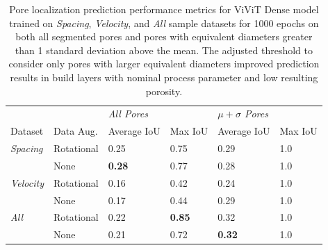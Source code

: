 \begin{table}
  \begin{tabular}{ll|ll|ll}
    \hline
    \rowcolor{gray!30}
                        &                   & \multicolumn{2}{|l|}{\textit{All Pores}}  & \multicolumn{2}{l}{\textit{$\mu + \sigma$ Pores}} \\
    \rowcolor{gray!30}
    Dataset             & Data Aug. & Average IoU    & Max IoU                  & Average IoU    & Max IoU                          \\
    \hline                                 
    \textit{Spacing}    &  Rotational       & 0.25           & 0.75                     & 0.29           & 1.0                     \\
                        &  None             & \textbf{0.28}  & 0.77                     & 0.28           & 1.0                              \\
    \rowcolor{gray!10}                     
    \textit{Velocity}   &  Rotational       & 0.16           & 0.42                     & 0.24           & 1.0                              \\
    \rowcolor{gray!10}                     
                        &  None             & 0.17           & 0.44                     & 0.29           & 1.0                              \\
    \textit{All}        &  Rotational       & 0.22           & \textbf{0.85}            & 0.32           & 1.0                              \\
                        &  None             & 0.21           & 0.72                     & \textbf{0.32}  & 1.0                     \\
    \hline
  \end{tabular}
  \caption{
    Pore localization prediction performance metrics for ViViT Dense model
    trained on \textit{Spacing}, \textit{Velocity}, and \textit{All} sample
    datasets for 1000 epochs on both all segmented pores and pores with
    equivalent diameters greater than 1 standard deviation above the mean. The
    adjusted threshold to consider only pores with larger equivalent diameters
    improved prediction results in build layers with nominal process parameter
    and low resulting porosity.
  }
  \label{tab:pore_localization_vivit_dense_results}
\end{table}

